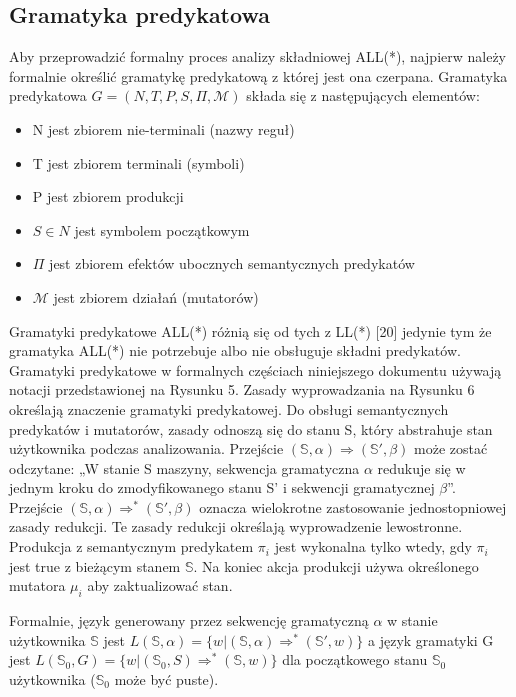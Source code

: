 ﻿\subsection{Gramatyka predykatowa}
Aby przeprowadzić formalny proces analizy składniowej ALL(*), najpierw należy formalnie
określić gramatykę predykatową z której jest ona czerpana.
Gramatyka predykatowa \(G = (N, T, P, S, \Pi, \mathcal{M})\) składa się z następujących elementów: 
\begin{itemize}
\item N jest zbiorem nie-terminali (nazwy reguł) 
\item T jest zbiorem terminali (symboli) 
\item P jest zbiorem produkcji 
\item \(S \in N\) jest symbolem początkowym 
\item \( \Pi \) jest zbiorem efektów ubocznych semantycznych predykatów
\item \(\mathcal{M}\) jest zbiorem działań (mutatorów) 
\end{itemize}
Gramatyki predykatowe ALL(*) różnią się od tych z LL(*) [20] jedynie tym że
gramatyka ALL(*) nie potrzebuje albo nie obsługuje składni predykatów.
Gramatyki predykatowe w formalnych częściach niniejszego dokumentu używają
notacji przedstawionej na Rysunku 5.
Zasady wyprowadzania na Rysunku 6 określają znaczenie gramatyki predykatowej.
Do obsługi semantycznych predykatów i mutatorów, zasady odnoszą się do stanu S,
który abstrahuje stan użytkownika podczas analizowania.
Przejście \(( \mathbb{S}, \alpha) \Rightarrow ( \mathbb{S'}, \beta) \)
może zostać odczytane: „W stanie S maszyny, sekwencja gramatyczna \(\alpha\)
redukuje się w jednym kroku do zmodyfikowanego stanu S' i sekwencji gramatycznej \(\beta\)”.
Przejście \((\mathbb{S}, \alpha) \Rightarrow^* (\mathbb{S'}, \beta)\)
oznacza wielokrotne zastosowanie jednostopniowej zasady redukcji.
Te zasady redukcji określają wyprowadzenie lewostronne.
Produkcja z semantycznym predykatem \(\pi_i\) jest wykonalna tylko wtedy,
gdy \(\pi_i\) jest true z bieżącym stanem \(\mathbb{S}\).
Na koniec akcja produkcji używa określonego mutatora \(\mu_i\) aby zaktualizować stan.
\par
Formalnie, język generowany przez sekwencję gramatyczną \(\alpha\)
w stanie użytkownika \(\mathbb{S}\)
jest \(L(\mathbb{S},\alpha) = \{w| (\mathbb{S},\alpha)\Rightarrow^*(\mathbb{S'},w)\} \)
a język gramatyki G jest \(L(\mathbb{S}_0,G) = \{w| (\mathbb{S}_0,S)\Rightarrow^*(\mathbb{S},w)\} \)
dla początkowego stanu \(\mathbb{S}_0\) użytkownika (\(\mathbb{S}_0\) może być puste).
